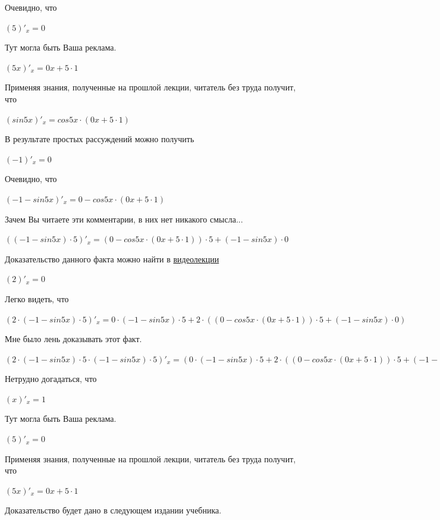 \documentclass[12pt,a4paper,fleqn]{article}
\theoremstyle{definition}
\begin{document}
Очевидно, что 

$( 5 )'_{x} =  0 $

Тут могла быть Ваша реклама. 

$( 5  x )'_{x} =  0  x  +  5  \cdot  1 $

Применяя знания, полученные на прошлой лекции, читатель без труда получит, что 

$(sin 5  x )'_{x} = cos 5  x  \cdot ( 0  x  +  5  \cdot  1 )$

В результате простых рассуждений можно получить 

$( -1 )'_{x} =  0 $

Очевидно, что 

$( -1  - sin 5  x )'_{x} =  0  - cos 5  x  \cdot ( 0  x  +  5  \cdot  1 )$

Зачем Вы читаете эти комментарии, в них нет никакого смысла... 

$(( -1  - sin 5  x ) \cdot  5 )'_{x} = ( 0  - cos 5  x  \cdot ( 0  x  +  5  \cdot  1 )) \cdot  5  + ( -1  - sin 5  x ) \cdot  0 $

Доказательство данного факта можно найти в \href{https://www.youtube.com/watch?v=dQw4w9WgXcQ}{видеолекции} 

$( 2 )'_{x} =  0 $

Легко видеть, что 

$( 2  \cdot ( -1  - sin 5  x ) \cdot  5 )'_{x} =  0  \cdot ( -1  - sin 5  x ) \cdot  5  +  2  \cdot (( 0  - cos 5  x  \cdot ( 0  x  +  5  \cdot  1 )) \cdot  5  + ( -1  - sin 5  x ) \cdot  0 )$

Мне было лень доказывать этот факт.

$( 2  \cdot ( -1  - sin 5  x ) \cdot  5  \cdot ( -1  - sin 5  x ) \cdot  5 )'_{x} = ( 0  \cdot ( -1  - sin 5  x ) \cdot  5  +  2  \cdot (( 0  - cos 5  x  \cdot ( 0  x  +  5  \cdot  1 )) \cdot  5  + ( -1  - sin 5  x ) \cdot  0 )) \cdot ( -1  - sin 5  x ) \cdot  5  +  2  \cdot ( -1  - sin 5  x ) \cdot  5  \cdot (( 0  - cos 5  x  \cdot ( 0  x  +  5  \cdot  1 )) \cdot  5  + ( -1  - sin 5  x ) \cdot  0 )$

Нетрудно догадаться, что 

$( x )'_{x} =  1 $

Тут могла быть Ваша реклама. 

$( 5 )'_{x} =  0 $

Применяя знания, полученные на прошлой лекции, читатель без труда получит, что 

$( 5  x )'_{x} =  0  x  +  5  \cdot  1 $

Доказательство будет дано в следующем издании учебника. 
\end{document}

